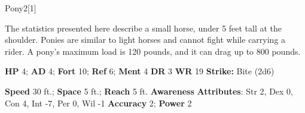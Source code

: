   \begin{monsection}{Pony}{2}[1]
    \vspace{-1em}\vspace{-1em}
    \vspace{0em}

    
      The statistics presented here describe a small horse, under 5 feet tall at the shoulder.
      Ponies are similar to light horses and cannot fight while carrying a rider.
      A pony's maximum load is 120 pounds, and it can drag up to 800 pounds.
    

    \begin{spellcontent}
      \begin{spelltargetinginfo}
        \pari \textbf{HP} 4;
          \textbf{AD} 4;
          \textbf{Fort} 10;
          \textbf{Ref} 6;
          \textbf{Ment} 4
        \pari \textbf{DR} 3
        \pari \textbf{WR} 19
        \pari \textbf{Strike:}
            Bite  (2d6)
      \end{spelltargetinginfo}
    \end{spellcontent}
    \begin{monsterfooter}
      \pari \textbf{Speed} 30 ft.;
        \textbf{Space} 5 ft.;
        \textbf{Reach} 5 ft.
      \pari \textbf{Awareness} 
      \pari \textbf{Attributes}:
        Str 2, Dex 0,
        Con 4, Int -7,
        Per 0, Wil -1
      \pari \textbf{Accuracy} 2;
        \textbf{Power} 2
    \end{monsterfooter}
  \end{monsection}
  

